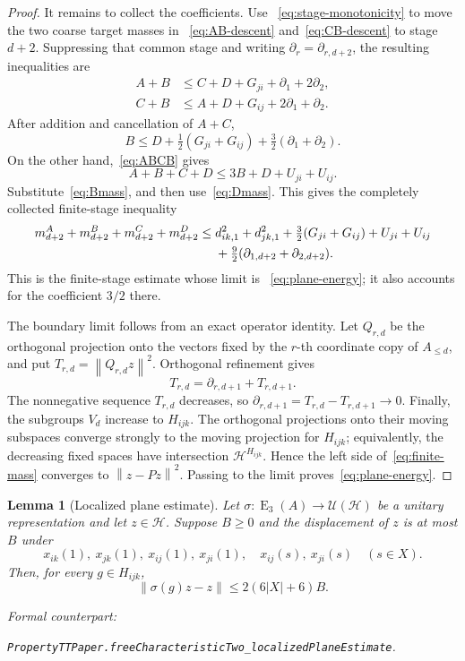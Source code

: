 \documentclass[11pt]{amsart}
\newif\ifanonymous\anonymoustrue
\newcommand{\leanrepo}{[repository link removed for anonymous review]}
\newcommand{\leanrepo}{https://github.com/SauersML/group-approximation}
\newcommand{\leanverified}[2]{%
  \par\smallskip\noindent
  {\normalfont\footnotesize\color{gray!70!black}%
  Formal counterpart:\par\nobreak\noindent
  \ifanonymous\nolinkurl{#2}\else
  \href{\leanrepo/blob/main/GroupApproximation/#1.lean}{\nolinkurl{#2}}\fi.}}
\newtheorem{lemma}[theorem]{Lemma}
\theoremstyle{definition}
\theoremstyle{plain}
\newcommand{\EL}{\operatorname{E}}
\newcommand{\norm}[1]{\left\lVert#1\right\rVert}
\newcommand{\abs}[1]{\left\lvert#1\right\rvert}
\begin{document}
\begin{proof}
It remains to collect the coefficients.  Use
~\eqref{eq:stage-monotonicity} to move the two coarse target masses in
~\eqref{eq:AB-descent} and~\eqref{eq:CB-descent} to stage \(d+2\).
Suppressing that common stage and writing
\(\partial_r=\partial_{r,d+2}\), the resulting inequalities are
\[
 \begin{aligned}
 A+B&\le C+D+G_{ji}+\partial_1+2\partial_2,\\
 C+B&\le A+D+G_{ij}+2\partial_1+\partial_2.
 \end{aligned}
\]
After addition and cancellation of \(A+C\),
\begin{equation}\label{eq:Bmass}
 B\le D+\tfrac12(G_{ji}+G_{ij})
       +\tfrac32(\partial_1+\partial_2).
\end{equation}
On the other hand,~\eqref{eq:ABCB} gives
\[
 A+B+C+D\le 3B+D+U_{ji}+U_{ij}.
\]
Substitute~\eqref{eq:Bmass}, and then use~\eqref{eq:Dmass}.  This
gives the completely collected finite-stage inequality
\begin{align}\label{eq:finite-mass}
 m_{d+2}^A+m_{d+2}^B+m_{d+2}^C+m_{d+2}^D
 \le{}&d_{ik,1}^2+d_{jk,1}^2
   +\tfrac32(G_{ji}+G_{ij})+U_{ji}+U_{ij}\notag\\
 &+\tfrac92(\partial_{1,d+2}+\partial_{2,d+2}).
\end{align}
This is the finite-stage estimate whose limit is
~\eqref{eq:plane-energy}; it also accounts for the coefficient
\(3/2\) there.

The boundary limit follows from an exact operator identity.  Let
\(Q_{r,d}\) be the orthogonal projection onto the vectors fixed by
the \(r\)-th coordinate copy of \(A_{\le d}\), and put
\(T_{r,d}=\norm{Q_{r,d}z}^2\).  Orthogonal refinement gives
\[
 T_{r,d}=\partial_{r,d+1}+T_{r,d+1}.
\]
The nonnegative sequence \(T_{r,d}\) decreases, so
\(\partial_{r,d+1}=T_{r,d}-T_{r,d+1}\to0\).  Finally, the subgroups
\(V_d\) increase to \(H_{ijk}\).  The orthogonal projections onto
their moving subspaces converge strongly to the moving projection for
\(H_{ijk}\); equivalently, the decreasing fixed spaces have
intersection \(\mathcal H^{H_{ijk}}\).  Hence the left side
of~\eqref{eq:finite-mass} converges to \(\norm{z-Pz}^2\).  Passing to
the limit proves~\eqref{eq:plane-energy}.
\end{proof}

\begin{lemma}[Localized plane estimate]\label{lem:localized-plane}
Let \(\sigma:\EL_3(A)\to\mathcal U(\mathcal H)\) be a unitary
representation and let \(z\in\mathcal H\).  Suppose \(B\ge0\) and
the displacement of \(z\) is at most \(B\) under
\[
 x_{ik}(1),\ x_{jk}(1),\ x_{ij}(1),\ x_{ji}(1),
 \quad x_{ij}(s),\ x_{ji}(s)\quad(s\in X).
\]
Then, for every \(g\in H_{ijk}\),
\[
  \norm{\sigma(g)z-z}
  \le 2(6\abs X+6)B.
\]
\leanverified{PropertyTT/PaperStatements}{PropertyTTPaper.freeCharacteristicTwo_localizedPlaneEstimate}
\end{lemma}
\end{document}
